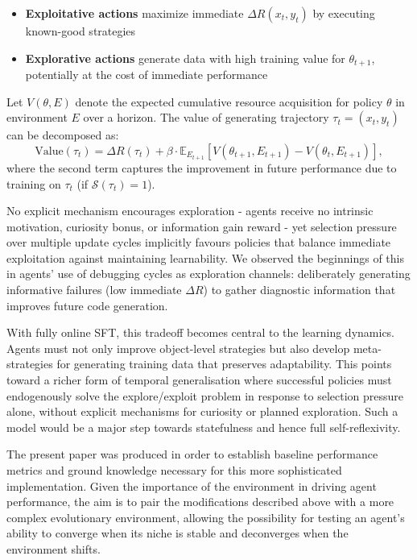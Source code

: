 \documentclass{article}
\begin{document}
\begin{itemize}
\item \textbf{Exploitative actions} maximize immediate $\Delta R(x_t, y_t)$ by executing known-good strategies
\item \textbf{Explorative actions} generate data with high training value for $\theta_{t+1}$, potentially at the cost of immediate performance
\end{itemize}

Let $V(\theta, E)$ denote the expected cumulative resource acquisition for policy $\theta$ in environment $E$ over a horizon. The value of generating trajectory $\tau_t = (x_t, y_t)$ can be decomposed as:
\[
\text{Value}(\tau_t) = \Delta R(\tau_t) + \beta \cdot \mathbb{E}_{E_{t+1}}[V(\theta_{t+1}, E_{t+1}) - V(\theta_t, E_{t+1})],
\]
where the second term captures the improvement in future performance due to training on $\tau_t$ (if $\mathcal{S}(\tau_t) = 1$).

No explicit mechanism encourages exploration - agents receive no intrinsic motivation, curiosity bonus, or information gain reward - yet selection pressure over multiple update cycles implicitly favours policies that balance immediate exploitation against maintaining learnability. We observed the beginnings of this in agents' use of debugging cycles as exploration channels: deliberately generating informative failures (low immediate $\Delta R$) to gather diagnostic information that improves future code generation.

With fully online SFT, this tradeoff becomes central to the learning dynamics. Agents must not only improve object-level strategies but also develop meta-strategies for generating training data that preserves adaptability. This points toward a richer form of temporal generalisation where successful policies must endogenously solve the explore/exploit problem in response to selection pressure alone, without explicit mechanisms for curiosity or planned exploration. Such a model would be a major step towards statefulness and hence full self-reflexivity.

The present paper was produced in order to establish baseline performance metrics and ground knowledge necessary for this more sophisticated implementation. Given the importance of the environment in driving agent performance, the aim is to pair the modifications described above with a more complex evolutionary environment, allowing the possibility for testing an agent’s ability to converge when its niche is stable and deconverges when the environment shifts.
\end{document}
